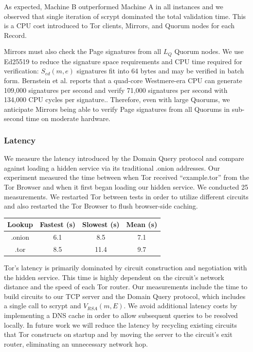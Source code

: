 \documentclass{sig-alternate}
\begin{document}
As expected, Machine B outperformed Machine A in all instances and we observed that single iteration of scrypt dominated the total validation time. This is a CPU cost introduced to Tor clients, Mirrors, and Quorum nodes for each Record.

Mirrors must also check the Page signatures from all $ L_{Q} $ Quorum nodes. We use Ed25519 to reduce the signature space requirements and CPU time required for verification: $ S_{\mathit{ed}}(m, e) $ signatures fit into 64 bytes and may be verified in batch form. Bernstein et al. reports that a quad-core Westmere-era CPU can generate 109,000 signatures per second and verify 71,000 signatures per second with 134,000 CPU cycles per signature.\cite{bernstein2011high}. Therefore, even with large Quorums, we anticipate Mirrors being able to verify Page signatures from all Quorums in sub-second time on moderate hardware.

\subsubsection{Latency}

We measure the latency introduced by the Domain Query protocol and compare against loading a hidden service via its traditional .onion addresses. Our experiment measured the time between when Tor received ``example.tor'' from the Tor Browser and when it first began loading our hidden service. We conducted 25 measurements. We restarted Tor between tests in order to utilize different circuits and also restarted the Tor Browser to flush browser-side caching.

\renewcommand{\arraystretch}{1}
\begin{center}
    \begin{tabular}{ | c | c | c | c |}
    \hline
    \textbf{Lookup} & \textbf{Fastest (s)} & \textbf{Slowest (s)} & \textbf{Mean (s)} \\
    \hline
    .onion & 6.1 & 8.5 & 7.1 \\ \hline
	.tor & 8.5 & 11.4 & 9.7 \\
	\hline
    \end{tabular}
\end{center}

Tor's latency is primarily dominated by circuit construction and negotiation with the hidden service. This time is highly dependent on the circuit's network distance and the speed of each Tor router. Our measurements include the time to build circuits to our TCP server and the Domain Query protocol, which includes a single call to scrypt and $ V_{\mathit{RSA}}(m, E) $. We avoid additional latency costs by implementing a DNS cache in order to allow subsequent queries to be resolved locally. In future work we will reduce the latency by recycling existing circuits that Tor constructs on startup and by moving the server to the circuit's exit router, eliminating an unnecessary network hop.
\end{document}
